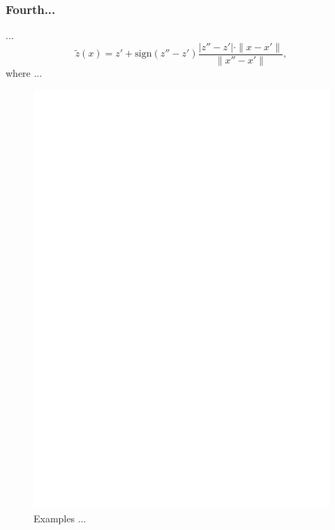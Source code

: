 \documentclass[runningheads]{llncs}
\begin{document}
\subsubsection{Fourth...} ...
\begin{equation}
\tilde{z}(x)=z'+ \text{sign}(z''-z') \frac {|z''-z'| \cdot \| x-x' \|}{\| x''-x' \|},
\end{equation}
where ... 
\begin{figure}
\includegraphics[width=\textwidth]{fig1.pdf}
\caption{Examples ... } \label{fig4}
\end{figure}
\end{document}
